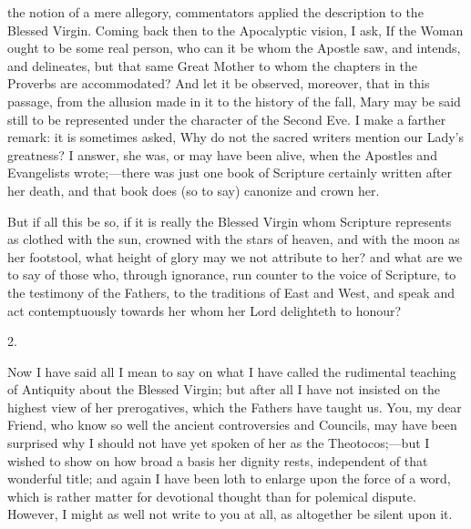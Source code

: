 the notion of a mere allegory, commentators applied the description to
the Blessed Virgin. Coming back then to the Apocalyptic vision, I ask,
If the Woman ought to be some real person, who can it be whom the
Apostle saw, and intends, and delineates, but that same Great Mother to
whom the chapters in the Proverbs are accommodated? And let it be
observed, moreover, that in this passage, from the allusion made in it
to the history of the fall, Mary may be said still to be represented
under the character of the Second Eve. I make a farther remark: it is
sometimes asked, Why do not the sacred writers mention our Lady's
greatness? I answer, she was, or may have been alive, when the Apostles
and Evangelists wrote;—there was just one book of Scripture certainly
written after her death, and that book does (so to say) canonize and
crown her.

But if all this be so, if it is really the Blessed Virgin whom
Scripture represents as clothed with the sun, crowned with the stars of
heaven, and with the moon as her footstool, what height of glory may we
not attribute to her? and what are we to say of those who, through
ignorance, run counter to the voice of Scripture, to the testimony of
the Fathers, to the traditions of East and West, and speak and act
contemptuously towards her whom her Lord delighteth to honour?

2.

Now I have said all I mean to say on what I have called the
rudimental teaching of Antiquity about the Blessed Virgin; but after all
I have not insisted on the highest view of her prerogatives, which the
Fathers have taught us. You, my dear Friend, who know so well the
ancient controversies and Councils, may have been surprised why I
should not have yet spoken of her as the Theotocos;—but I wished to
show on how broad a basis her dignity rests, independent of that
wonderful title; and again I have been loth to enlarge upon the force of
a word, which is rather matter for devotional thought than for polemical
dispute. However, I might as well not write to you at all, as altogether
be silent upon it.

